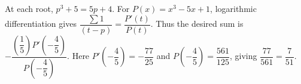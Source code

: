 At each root, $p^3+5=5p+4$. For $P(x)=x^3-5x+1$, logarithmic differentiation gives $\dfrac{\sum1}{(t-p)}=\dfrac{P\prime(t)}{P(t)}$. Thus the desired sum is $-\dfrac{(\dfrac{1}{5})P\prime(-\dfrac{4}{5})}{P(-\dfrac{4}{5})}$. Here $P\prime(-\dfrac{4}{5})=-\dfrac{77}{25}$ and $P(-\dfrac{4}{5})=\dfrac{561}{125}$, giving $\dfrac{77}{561}=\boxed{\dfrac{7}{51}}$.
